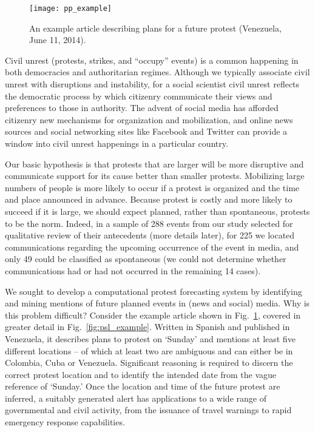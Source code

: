 \begin{figure}
    \centering
    \texttt{[image: pp\_example]}
    \caption{An example article describing plans for a future protest (Venezuela, June 11, 2014).}
    \vspace{-2em}
    \label{pp_example}
\end{figure}
Civil unrest (protests, strikes, and ``occupy'' events) is a common happening in both democracies
and authoritarian regimes.
Although we typically associate civil unrest with disruptions and instability, for a social scientist
civil unrest reflects the democratic process by 
which citizenry communicate their views and preferences to those in authority. 
The advent of social
media has afforded citizenry new mechanisms for organization and mobilization, and online news sources
and social networking sites like Facebook and Twitter
can provide a window into civil unrest happenings in a particular country.

Our basic hypothesis is that
protests that are larger will be more disruptive and communicate support for its cause better than smaller protests. 
Mobilizing large numbers of people is more likely to occur if a protest is organized and the time and place announced in
advance. Because protest is costly and more likely to succeed if it is large, we should expect planned, rather than 
spontaneous, protests to be the norm. Indeed, in a sample of 288 events from our study selected for qualitative review of their antecedents
(more details later), for 225 we located communications regarding the upcoming occurrence of the event in media, and only 49 could be classified as 
spontaneous (we could not determine whether communications had or had not occurred in the remaining 14 cases).

We sought to develop
a computational protest forecasting system by
identifying and mining mentions of future planned events
in (news and social) media.  
Why is this problem difficult? Consider the example article shown in Fig.~\ref{pp_example},
covered in greater detail in Fig.~\ref{fig:psl_example}. Written in Spanish and published in Venezuela, it describes plans 
to protest on `Sunday' and mentions at least five different locations -- of which at least two are ambiguous and can either be in Colombia, Cuba or Venezuela. 
Significant reasoning is required to discern the correct protest location and to identify the intended date
from the vague reference of `Sunday.' Once the location and time of the future
protest are inferred, a suitably generated alert has applications to a wide range of 
governmental and civil activity, from the issuance of travel warnings
to rapid emergency response capabilities.  


